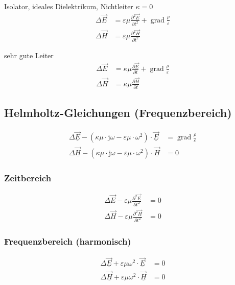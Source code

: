 Isolator, ideales Dielektrikum, Nichtleiter $\kappa = 0$
\begin{align*}
    \Delta \vec{E} & =\varepsilon \mu \frac{\partial^{2} \vec{E}}{\partial t^{2}}+\operatorname{grad} \frac{\rho}{\varepsilon} \\
    \Delta \vec{H} & =\varepsilon \mu \frac{\partial^{2} \vec{H}}{\partial t^{2}}
\end{align*}

sehr gute Leiter
\begin{align*}
    \Delta \vec{E} & =\kappa \mu \frac{\partial \vec{E}}{\partial t}+\operatorname{grad} \frac{\rho}{\varepsilon} \\
    \Delta \vec{H} & =\kappa \mu \frac{\partial \vec{H}}{\partial t}
\end{align*}

\subsection{Helmholtz-Gleichungen (Frequenzbereich)}
\begin{align*}
    \Delta \underline{\vec{E}}-\left(\kappa \mu \cdot \mathrm{j} \omega-\varepsilon \mu \cdot \omega^{2}\right) \cdot \underline{\vec{E}} & = \operatorname{grad} \frac{\rho}{\varepsilon} \\
    \Delta \underline{\vec{H}}-\left(\kappa \mu \cdot \mathrm{j} \omega-\varepsilon \mu \cdot \omega^{2}\right) \cdot \underline{\vec{H}} & = 0
\end{align*}

\subsubsection{Zeitbereich}
\begin{align*}
    \Delta \vec{E}-\varepsilon \mu \frac{\partial^{2} \vec{E}}{\partial t^{2}} & =0 \\
    \Delta \vec{H}-\varepsilon \mu \frac{\partial^{2} \vec{H}}{\partial t^{2}} & =0
\end{align*}

\subsubsection{Frequenzbereich (harmonisch)}
\begin{align*}
    \Delta \underline{\vec{E}}+\varepsilon \mu \omega^{2} \cdot \underline{\vec{E}} & =0 \\
    \Delta \underline{\vec{H}}+\varepsilon \mu \omega^{2} \cdot \underline{\vec{H}} & =0
\end{align*}

